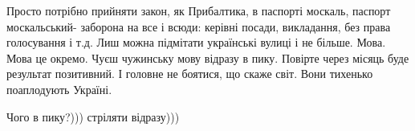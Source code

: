  
 
 
 
 

\begin{cmtfront}

Просто потрібно прийняти закон, як Прибалтика, в паспорті москаль, паспорт
москальський- заборона на все і всюди: керівні посади, викладання, без права
голосування і т.д. Лиш можна підмітати українські вулиці і не більше. Мова.
Мова це окремо. Чуєш чужинську мову відразу в пику. Повірте через місяць буде
результат позитивний. І головне не боятися, що скаже світ. Вони тихенько
поаплодують Україні.	


Чого в пику?))) стріляти відразу)))

\end{cmtfront}
